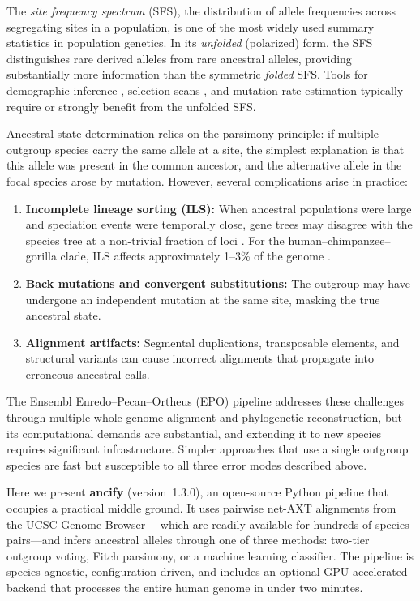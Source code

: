 \documentclass[11pt,a4paper]{article}
\begin{document}
The \emph{site frequency spectrum} (SFS), the distribution of allele
frequencies across segregating sites in a population, is one of the most
widely used summary statistics in population genetics. In its
\emph{unfolded} (polarized) form, the SFS distinguishes rare derived alleles
from rare ancestral alleles, providing substantially more information than
the symmetric \emph{folded} SFS. Tools for demographic inference
\citep{Gutenkunst2009,Jouganous2017}, selection scans
\citep{Nielsen2005,Fay2000}, and mutation rate estimation
\citep{DeGiorgio2016} typically require or strongly benefit from the
unfolded SFS.

Ancestral state determination relies on the parsimony principle: if multiple
outgroup species carry the same allele at a site, the simplest explanation
is that this allele was present in the common ancestor, and the alternative
allele in the focal species arose by mutation. However, several complications
arise in practice:

\begin{enumerate}[leftmargin=2em]
    \item \textbf{Incomplete lineage sorting (ILS):} When ancestral
        populations were large and speciation events were temporally close,
        gene trees may disagree with the species tree at a non-trivial
        fraction of loci \citep{Degnan2009,Hobolth2011}. For the
        human--chimpanzee--gorilla clade, ILS affects approximately
        1--3\% of the genome \citep{Scally2012}.
    \item \textbf{Back mutations and convergent substitutions:} The
        outgroup may have undergone an independent mutation at the same
        site, masking the true ancestral state.
    \item \textbf{Alignment artifacts:} Segmental duplications, transposable
        elements, and structural variants can cause incorrect alignments that
        propagate into erroneous ancestral calls.
\end{enumerate}

The Ensembl Enredo--Pecan--Ortheus (EPO) pipeline \citep{Paten2008} addresses
these challenges through multiple whole-genome alignment and phylogenetic
reconstruction, but its computational demands are substantial, and extending
it to new species requires significant infrastructure. Simpler approaches
that use a single outgroup species are fast but susceptible to all three
error modes described above.

Here we present \textbf{ancify} (version~1.3.0), an open-source Python
pipeline that occupies a practical middle ground. It uses pairwise net-AXT
alignments from the UCSC Genome Browser \citep{Kent2003}---which are readily
available for hundreds of species pairs---and infers ancestral alleles through
one of three methods: two-tier outgroup voting, Fitch parsimony, or a machine
learning classifier. The pipeline is species-agnostic, configuration-driven,
and includes an optional GPU-accelerated backend that processes the entire
human genome in under two minutes.
\end{document}
